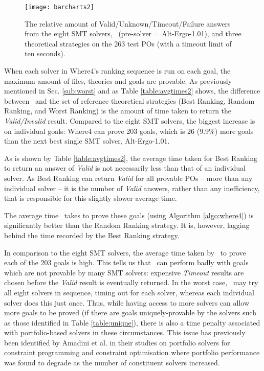 \begin{figure}
	\centering
	\texttt{[image: barcharts2]}
	\caption[The relative amount of Valid/Unknown/Timeout/Failure answers from the eight SMT solvers, \where, and three theoretical strategies.]{The relative amount of Valid/Unknown/Timeout/Failure answers from the eight SMT solvers, \where~(pre-solver = Alt-Ergo-1.01), and three theoretical strategies on the 263 test POs (with a timeout limit of ten seconds).}
	\label{fig:barchart2}
\end{figure}


When each solver in \textsf{Where4}'s ranking sequence is run on each goal, the maximum amount of files, theories and goals are provable. 
As previously mentioned in Sec. \ref{sub:worst} and as Table \ref{table:avgtimes2} shows, the difference between \where~and the set of reference theoretical strategies (\textsf{Best Ranking}, \textsf{Random Ranking}, and \textsf{Worst Ranking}) is the amount of time taken to return the \textit{Valid/Invalid} result. 
Compared to the eight SMT solvers, the biggest increase is on individual goals: \textsf{Where4} can prove 203 goals, which is 26 (9.9\%) more goals than the next best single SMT solver, Alt-Ergo-1.01.

As is shown by Table \ref{table:avgtimes2}, the average time taken for \textsf{Best Ranking} to return an answer of \textit{Valid} is not necessarily less than that of an individual solver. 
As \textsf{Best Ranking} can return \textit{Valid} for all provable POs -- more than any individual solver --
it is the number of \textit{Valid} answers, rather than any inefficiency, that is responsible for this slightly slower average time.  

The average time \where~takes to prove these goals 
(using Algorithm \ref{algo:where4}) 
is significantly better than the \textsf{Random Ranking} strategy.
It is, however, lagging behind the time recorded by the \textsf{Best Ranking} strategy. 

In comparison to the eight SMT solvers, the average time taken by \where~to prove each of the 203 goals is high. 
This tells us that \where~can perform badly with goals which are not provable by many SMT solvers: expensive \textit{Timeout} results are chosen before the \textit{Valid} result is eventually returned. 
In the worst case, \where~may try all eight solvers in sequence, timing out for each solver, whereas each individual solver does this just once. 
Thus, while having access to more solvers can allow more goals to be proved (if there are goals uniquely-provable by the solvers such as those identified in Table \ref{table:unique}), there is also a time penalty associated with portfolio-based solvers in these circumstances.
This issue has previously been identified by Amadini et al. in their studies on portfolio solvers for constraint programming \cite{Amadini2013} and constraint optimisation \cite{Amadini2016} where portfolio performance was found to degrade as the number of constituent solvers increased.

